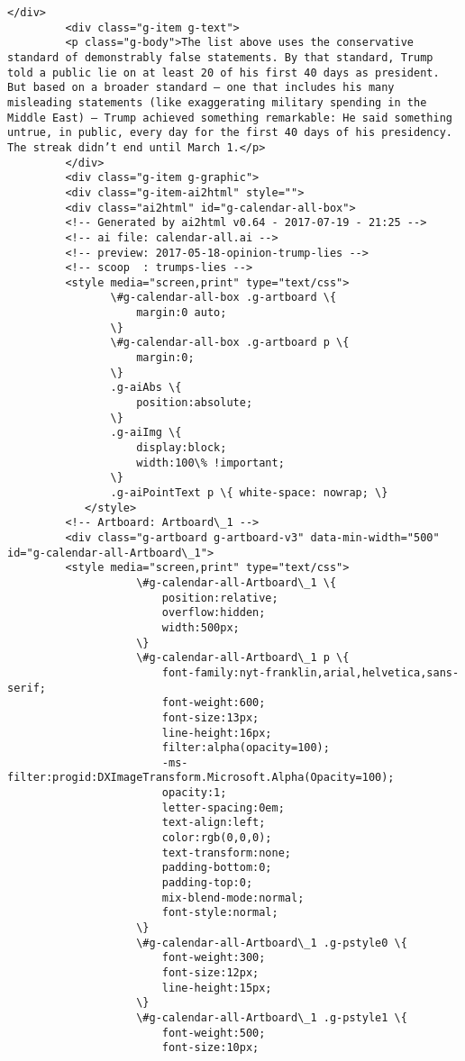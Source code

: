\documentclass[11pt]{article}
\begin{document}
\begin{Verbatim}[commandchars=\\\{\}]
         </div>
         <div class="g-item g-text">
         <p class="g-body">The list above uses the conservative standard of demonstrably false statements. By that standard, Trump told a public lie on at least 20 of his first 40 days as president. But based on a broader standard — one that includes his many misleading statements (like exaggerating military spending in the Middle East) — Trump achieved something remarkable: He said something untrue, in public, every day for the first 40 days of his presidency. The streak didn’t end until March 1.</p>
         </div>
         <div class="g-item g-graphic">
         <div class="g-item-ai2html" style="">
         <div class="ai2html" id="g-calendar-all-box">
         <!-- Generated by ai2html v0.64 - 2017-07-19 - 21:25 -->
         <!-- ai file: calendar-all.ai -->
         <!-- preview: 2017-05-18-opinion-trump-lies -->
         <!-- scoop  : trumps-lies -->
         <style media="screen,print" type="text/css">
         		\#g-calendar-all-box .g-artboard \{
         			margin:0 auto;
         		\}
         		\#g-calendar-all-box .g-artboard p \{
         			margin:0;
         		\}
         		.g-aiAbs \{
         			position:absolute;
         		\}
         		.g-aiImg \{
         			display:block;
         			width:100\% !important;
         		\}
         		.g-aiPointText p \{ white-space: nowrap; \}
         	</style>
         <!-- Artboard: Artboard\_1 -->
         <div class="g-artboard g-artboard-v3" data-min-width="500" id="g-calendar-all-Artboard\_1">
         <style media="screen,print" type="text/css">
         			\#g-calendar-all-Artboard\_1 \{
         				position:relative;
         				overflow:hidden;
         				width:500px;
         			\}
         			\#g-calendar-all-Artboard\_1 p \{
         				font-family:nyt-franklin,arial,helvetica,sans-serif;
         				font-weight:600;
         				font-size:13px;
         				line-height:16px;
         				filter:alpha(opacity=100);
         				-ms-filter:progid:DXImageTransform.Microsoft.Alpha(Opacity=100);
         				opacity:1;
         				letter-spacing:0em;
         				text-align:left;
         				color:rgb(0,0,0);
         				text-transform:none;
         				padding-bottom:0;
         				padding-top:0;
         				mix-blend-mode:normal;
         				font-style:normal;
         			\}
         			\#g-calendar-all-Artboard\_1 .g-pstyle0 \{
         				font-weight:300;
         				font-size:12px;
         				line-height:15px;
         			\}
         			\#g-calendar-all-Artboard\_1 .g-pstyle1 \{
         				font-weight:500;
         				font-size:10px;

\end{Verbatim}
\end{document}
